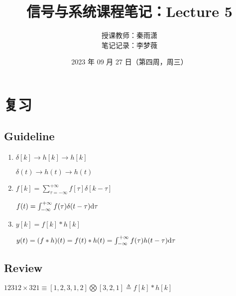 \documentclass[UTF8]{ctexart}
\begin{document}
\title{信号与系统课程笔记：Lecture 5}
\author{授课教师：秦雨潇 \\
        笔记记录：李梦薇}
\date{2023 年 09 月 27 日（第四周，周三）}
\maketitle

\section{复习}
\subsection{Guideline}
\begin{enumerate}[align=left,label=(\arabic*)]
    \item $\delta[k]\longrightarrow\boxed{h[k]}\longrightarrow{h[k]}$ \par
          $\delta(t)\longrightarrow\boxed{h(t)}\longrightarrow{h(t)}$
    \item $f[k]=\sum_{\tau=-\infty}^{+\infty}{f[\tau]\delta[k-\tau]}$ \par
          $f(t)=\int_{-\infty}^{+\infty}{f(\tau)\delta(t-\tau)\rm{d}\tau}$
    \item $y[k]=f[k]\ast{h[k]}$ \par
          $y(t)=(f\ast{h})(t)=f(t)\ast{h(t)}=\int_{-\infty}^{+\infty}{f(\tau)h(t-\tau)\rm{d}\tau}$
\end{enumerate}

\subsection{Review}
$12312\times321\equiv[1,2,3,1,2]\bigotimes[3,2,1]\triangleq{f[k]\ast{h[k]}}$
\end{document}

